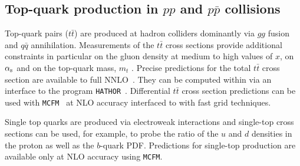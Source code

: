 \subsection{Top-quark production in $pp$ and $p \bar p$ collisions}

Top-quark pairs ($t \bar t$) are produced at hadron colliders dominantly via $gg$ fusion 
and $q \bar q$ annihilation. Measurements of the $t \bar t$ cross sections provide additional 
constraints in particular on the gluon density at medium to high values of $x$, 
on $\alpha_\mathrm{s}$ and on the top-quark mass, $m_t$ \cite{cms:top}. 
Precise predictions for the total $t \bar t$ cross section are available 
to full NNLO~\cite{Czakon:2013goa}. They can be computed within \fitter via an interface 
to the program \texttt{HATHOR}~\cite{Aliev:2010zk}. Differential $t \bar t$ cross section
predictions can be used with
\texttt{MCFM}~\cite{Campbell:2010ff,Campbell:2009ss,Campbell:2005bb,Campbell:2004ch,Campbell:2012uf} 
at NLO accuracy interfaced to \fitter with fast grid techniques.

Single top quarks are produced via electroweak interactions and single-top cross sections 
can be used, for example, to probe the ratio of the $u$ and $d$ densities in the proton 
as well as the $b$-quark PDF. Predictions 
for single-top production are available only at NLO accuracy using \texttt{MCFM}.


%
